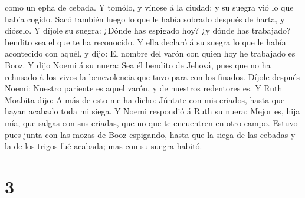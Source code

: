 como un epha de cebada.  Y tomólo, y vínose á la ciudad; y
su suegra vió lo que había cogido. Sacó también luego lo que le había
sobrado después de harta, y dióselo.  Y díjole su suegra:
¿Dónde has espigado hoy? ¿y dónde has trabajado? bendito sea el que te
ha reconocido. Y ella declaró á su suegra lo que le había acontecido con
aquél, y dijo: El nombre del varón con quien hoy he trabajado es Booz.
 Y dijo Noemi á su nuera: Sea él bendito de Jehová, pues
que no ha rehusado á los vivos la benevolencia que tuvo para con los
finados. Díjole después Noemi: Nuestro pariente es aquel varón, y de
nuestros redentores es.  Y Ruth Moabita dijo: A más de esto
me ha dicho: Júntate con mis criados, hasta que hayan acabado toda mi
siega.  Y Noemi respondió á Ruth su nuera: Mejor es, hija
mía, que salgas con sus criadas, que no que te encuentren en otro campo.
 Estuvo pues junta con las mozas de Booz espigando, hasta
que la siega de las cebadas y la de los trigos fué acabada; mas con su
suegra habitó.

\hypertarget{section-2}{%
\section{3}\label{section-2}}

